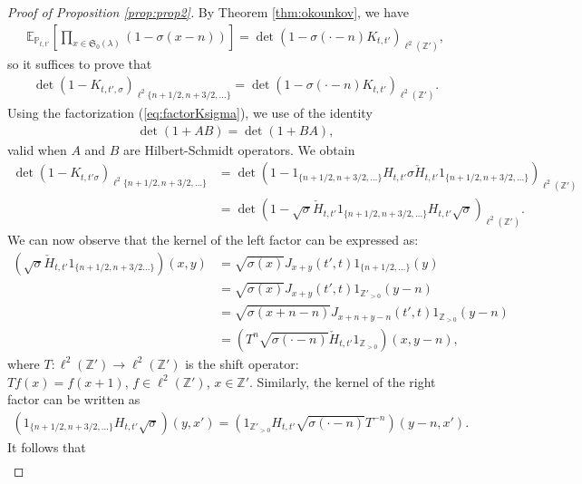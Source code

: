 \documentclass[12pt]{amsart}
\theoremstyle{definition}
\renewcommand{\P}{\mathbb{P}}
\newcommand{\Z}{\mathbb{Z}}
\newcommand{\E}{\mathbb{E}}
\begin{document}
\begin{proof}[Proof of Proposition \ref{prop:prop2}]
By Theorem \ref{thm:okounkov}, we have
\begin{align*}
    \E_{\P_{t,t'}} \left[ \prod_{x\in \mathfrak{S}_0(\lambda)}(1-\sigma(x-n) )\right] = \det(1- \sigma(\cdot-n)K_{t,t'})_{\ell^2(\Z')},
\end{align*}
so it suffices to prove that
\begin{align*}
    \det(1-K_{t,t',\sigma})_{\ell^2\{n+1/2,n+3/2,\dots\}}= \det(1- \sigma(\cdot-n)K_{t,t'})_{\ell^2(\Z')}.
\end{align*}
Using the factorization (\ref{eq:factorKsigma}), we use of the identity
\begin{align*}
\det(1 + AB ) = \det(1 +BA),
\end{align*}
valid when $A$ and $B$ are Hilbert-Schmidt operators. We obtain
\begin{align*}
\det \left( 1 -K_{t,t'\sigma} \right)_{\ell^2 \{n+1/2,n+3/2, \dots \}} &= \det \left( 1 - \mathfrak{1}_{ \{n+1/2,n+3/2, \dots \} } H_{t,t'} \sigma \check{H}_{t,t'} \mathfrak{1}_{ \{n+1/2,n+3/2,\dots \} } \right)_{\ell^2(\Z')}\\
&= \det \left(1 - \sqrt{\sigma} \check{H}_{t,t'} \mathfrak{1}_{\{n+1/2,n+3/2,\dots\}}H_{t,t'} \sqrt{\sigma} \right)_{\ell^2(\Z')}.
\end{align*}
We can now observe that the kernel of the left factor can be expressed as:
\begin{align*}
    \left(\sqrt{\sigma} \check{H}_{t,t'} \mathfrak{1}_{\{n+1/2,n+3/2\dots\}}\right)(x,y)&=\sqrt{\sigma(x)}J_{x+y}(t',t)\mathfrak{1}_{\{n+1/2,\dots\}}(y) \\
    &= \sqrt{\sigma(x)}J_{x+y}(t',t)\mathfrak{1}_{\Z'_{>0}}(y-n) \\
    &=\sqrt{\sigma(x+n-n)} J_{x+n+y-n}(t',t) \mathfrak{1}_{\Z_{>0}}(y-n)\\
    &=\left(T^n\sqrt{\sigma(\cdot-n)}\check{H}_{t,t'}\mathfrak{1}_{\Z_{>0}}\right)(x,y-n),
\end{align*}
where $T: \ell^2(\Z') \to \ell^2(\Z')$ is the shift operator: $Tf(x)=f(x+1), \, f \in \ell^2(\Z')$,  $x \in \Z'$. Similarly, the kernel of the right factor can be written as
\begin{align*}
    \left( \mathfrak{1}_{\{n+1/2,n+3/2,\dots\}} H_{t,t'}\sqrt{\sigma} \right)(y,x') = \left(\mathfrak{1}_{\Z'_{>0}} H_{t,t'}\sqrt{\sigma(\cdot-n)}T^{-n}\right)(y-n,x').
\end{align*}
It follows that
\begin{align*}

\end{align*}
\end{proof}
\end{document}
